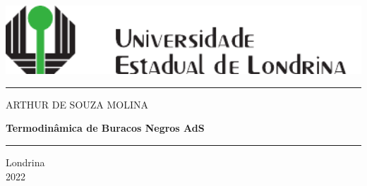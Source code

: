 \documentclass[12pt,a4paper,oneside,brazil]{abntex2}
\theoremstyle{definition}
\numberwithin{defin}{section}
\numberwithin{thm}{section}
\numberwithin{notation}{section}
\theoremstyle{remark}
\numberwithin{exmp}{section}
\numberwithin{p}{section}
\numberwithin{lema}{section}
\begin{document}
	
	
	\thispagestyle{empty}
	\begin{center}
		\includegraphics[width=14.8cm]{figuras/logo} 
		\par\end{center}
	
	\begin{center}
		{\color{green!45!black} \rule{1\columnwidth}{1.5mm}}
		\par\end{center}
	
	\begin{center}
		\medskip{}
		\par\end{center}
	
	\begin{center}
		{\Large{}ARTHUR DE SOUZA MOLINA}
		\par\end{center}{\Large \par}
	
	\begin{center}
		\vfill{}
		\par\end{center}
	
	\begin{DoubleSpace}
		\begin{center}
			\textbf{\Large{}Termodinâmica de Buracos Negros AdS}
			\par\end{center}{\Large \par}
	\end{DoubleSpace}
	
	\begin{center}
		\vfill{}
		\par\end{center}
	
	\begin{center}
		{\color{green!45!black} \rule{1\columnwidth}{1.5mm}}
		\par\end{center}
	
	\begin{center}
		Londrina \\
		2022
		\par\end{center}
	
\end{document}
